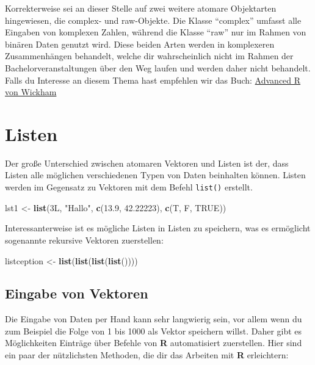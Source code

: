 \documentclass[
]{book}
\newenvironment{Shaded}{\begin{snugshade}}{\end{snugshade}}
\newcommand{\FloatTok}[1]{\textcolor[rgb]{0.00,0.00,0.81}{#1}}
\newcommand{\KeywordTok}[1]{\textcolor[rgb]{0.13,0.29,0.53}{\textbf{#1}}}
\newcommand{\NormalTok}[1]{#1}
\newcommand{\OtherTok}[1]{\textcolor[rgb]{0.56,0.35,0.01}{#1}}
\newcommand{\StringTok}[1]{\textcolor[rgb]{0.31,0.60,0.02}{#1}}
\begin{document}
Korrekterweise sei an dieser Stelle auf zwei weitere atomare Objektarten hingewiesen, die complex- und raw-Objekte.
Die Klasse ``complex'' umfasst alle Eingaben von komplexen Zahlen, während die Klasse ``raw'' nur im Rahmen von binären Daten genutzt wird.
Diese beiden Arten werden in komplexeren Zusammenhängen behandelt, welche dir wahrscheinlich nicht im Rahmen der Bachelorveranstaltungen über den Weg laufen und werden daher nicht behandelt.
Falls du Interesse an diesem Thema hast empfehlen wir das Buch: \href{https://adv-r.hadley.nz/}{Advanced R von Wickham}

\hypertarget{listen}{%
\section{Listen}\label{listen}}

Der große Unterschied zwischen atomaren Vektoren und Listen ist der, dass Listen alle möglichen verschiedenen Typen von Daten beinhalten können.
Listen werden im Gegensatz zu Vektoren mit dem Befehl \texttt{list()} erstellt.

\begin{Shaded}
\begin{Highlighting}[]
\NormalTok{lst1 <-}\StringTok{ }\KeywordTok{list}\NormalTok{(3L, }\StringTok{"Hallo"}\NormalTok{, }\KeywordTok{c}\NormalTok{(}\FloatTok{13.9}\NormalTok{, }\FloatTok{42.22223}\NormalTok{), }\KeywordTok{c}\NormalTok{(T, F, }\OtherTok{TRUE}\NormalTok{))}
\end{Highlighting}
\end{Shaded}

Interessanterweise ist es mögliche Listen in Listen zu speichern, was es ermöglicht sogenannte rekursive Vektoren zuerstellen:

\begin{Shaded}
\begin{Highlighting}[]
\NormalTok{listception <-}\StringTok{ }\KeywordTok{list}\NormalTok{(}\KeywordTok{list}\NormalTok{(}\KeywordTok{list}\NormalTok{(}\KeywordTok{list}\NormalTok{())))}
\end{Highlighting}
\end{Shaded}

\hypertarget{eingabe-von-vektoren}{%
\subsection{Eingabe von Vektoren}\label{eingabe-von-vektoren}}

Die Eingabe von Daten per Hand kann sehr langwierig sein, vor allem wenn du zum Beispiel die Folge von 1 bis 1000 als Vektor speichern willst.
Daher gibt es Möglichkeiten Einträge über Befehle von \textbf{R} automatisiert zuerstellen.
Hier sind ein paar der nützlichsten Methoden, die dir das Arbeiten mit \textbf{R} erleichtern:
\end{document}

